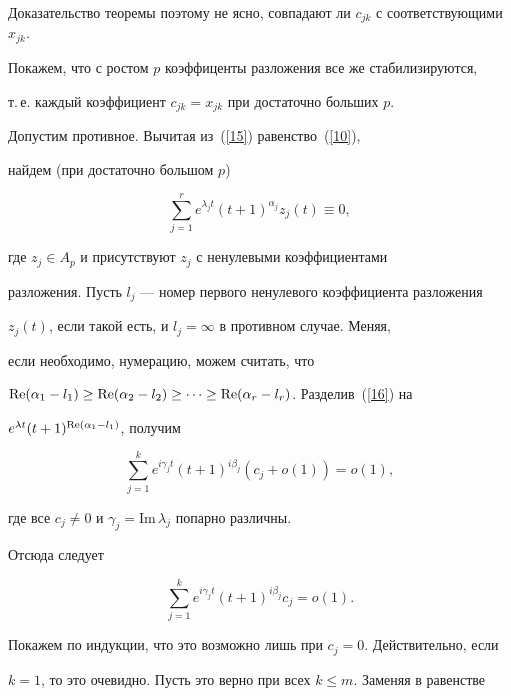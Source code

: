 \begin{pf*}{Доказательство теоремы}
поэтому не ясно, совпадают ли $c_{jk}$ с соответствующими $x_{jk}$. 


Покажем, что с ростом $p$ коэффиценты разложения все же стабилизируются, 


т.\,е. каждый коэффициент $c_{jk}=x_{jk}$ при достаточно больших $p$. 


Допустим противное. Вычитая из~(\ref{15}) равенство~(\ref{10}), 


найдем (при достаточно большом $p$)


\begin{equation}


\label{16}


\sum\limits_{j=1}^r e^{\lambda_jt}(t+1)^{\alpha_{j}}z_j (t)\equiv 0,


\end{equation}


где ${z_j\in A_p}$ и присутствуют $z_j$ с ненулевыми коэффициентами 


разложения. Пусть $l_j$ --- номер первого ненулевого коэффициента разложения 


$z_j (t)$, если такой есть, и $l_j=\infty$ в противном случае. Меняя, 


если необходимо, нумерацию, можем считать, что 


$\re (\alpha_1-l_1)\ge \re (\alpha_2-l_2)\ge 


\dotsb \ge\re (\alpha_r-l_r)$. Разделив~(\ref{16}) на 


$e^{\lambda t}(t+1)^{\operatorname{Re} (\alpha_{1}-l_1)}$, получим


$$


\sum\limits_{j=1}^k


e^{i\gamma_jt}(t+1)^{i\beta_{j}} (c_j+o (1))=o (1),


$$


где все $c_j\neq 0$ и $\gamma_j=\mathrm{Im}\,\lambda_j$ попарно различны. 


Отсюда следует


$$


\sum\limits_{j=1}^k e^{i\gamma_jt}(t+1)^{i\beta_{j}}c_j=o (1).


$$


Покажем по индукции, что это возможно лишь при $c_j=0$. Действительно, если 


$k=1$, то это очевидно. Пусть это верно при всех $k\le m$. Заменяя в равенстве


\begin{equation}


\label{17}



\end{equation}
\end{pf*}
